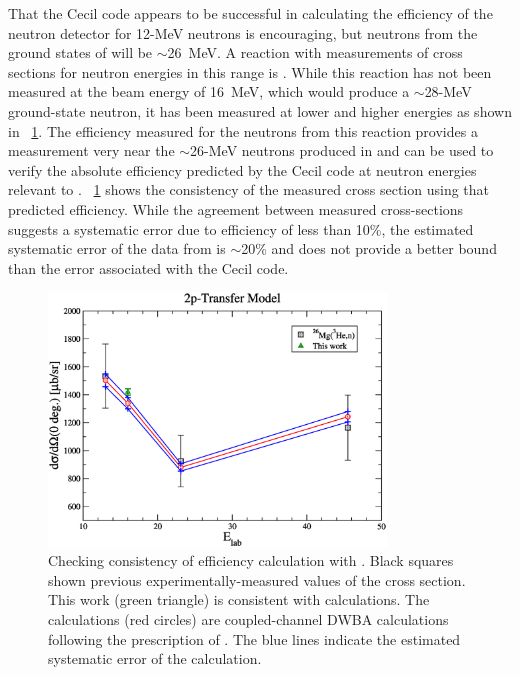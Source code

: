 That the Cecil code appears to be successful in calculating the efficiency of the neutron detector for 12-MeV neutrons is encouraging, but neutrons from the ground states of \reaction will be $\sim$26~MeV.  A reaction with measurements of cross sections for neutron energies in this range is \MgReaction.  While this reaction has not been measured at the beam energy of 16~MeV, which would produce a $\sim$28-MeV ground-state neutron, it has been measured at lower and higher energies \citep{MgCrossSection1,Bohne_Mg} as shown in {\fig}~\ref{fig:efficiencyCalib}.  The efficiency measured for the neutrons from this reaction provides a measurement very near the $\sim$26-MeV neutrons produced in \reaction and can be used to verify the absolute efficiency predicted by the Cecil code at neutron energies relevant to \reaction.  {\fig}~\ref{fig:efficiencyCalib} shows the consistency of the measured cross section using that predicted efficiency.  While the agreement between measured cross-sections suggests a systematic error due to efficiency of less than 10\%, the estimated systematic error of the data from \MgReaction is $\sim$20\% \citep{MgCrossSection1,Bohne_Mg} and does not provide a better bound than the error associated with the Cecil code.
\begin{figure}[!htbp]
\centering
\includegraphics[width=0.8\textwidth]{figures/magnesiumMatch.eps}
\caption[Checking consistency of efficiency calculation with \MgReaction by comparing to nearby measured cross sections.]{Checking consistency of efficiency calculation with \MgReaction.  Black squares shown previous experimentally-measured values of the cross section.  This work (green triangle) is consistent with calculations.  The calculations (red circles) are coupled-channel DWBA calculations following the prescription of \citep{MgCrossSection1}.  The blue lines indicate the estimated systematic error of the calculation.}
\label{fig:efficiencyCalib}
\end{figure}

